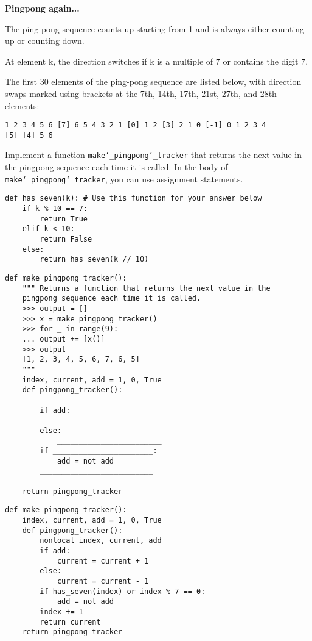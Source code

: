 \begin{blocksection}
\question \textbf{Pingpong again...}\\
\begin{nonsol}
The ping-pong sequence counts up starting from 1 and is
always either counting up or counting down.

At element k, the direction switches if k is a multiple of 7 or contains the
digit 7.

The first 30 elements of the ping-pong sequence are listed below, with direction
swaps marked using brackets at the 7th, 14th, 17th, 21st, 27th, and 28th
elements:
\begin{lstlisting}
1 2 3 4 5 6 [7] 6 5 4 3 2 1 [0] 1 2 [3] 2 1 0 [-1] 0 1 2 3 4
[5] [4] 5 6
\end{lstlisting}
\end{nonsol}

Implement a function \texttt{make\char`_pingpong\char`_tracker} that returns the
next value in the pingpong sequence each time it is called. In the body of
\texttt{make\char`_pingpong\char`_tracker}, you can use assignment statements.
\newline

\begin{lstlisting}
def has_seven(k): # Use this function for your answer below
    if k % 10 == 7:
        return True
    elif k < 10:
        return False
    else:
        return has_seven(k // 10)
\end{lstlisting}

\begin{nonsol}
\begin{lstlisting}
def make_pingpong_tracker():
    """ Returns a function that returns the next value in the
    pingpong sequence each time it is called.
    >>> output = []
    >>> x = make_pingpong_tracker()
    >>> for _ in range(9):
    ... output += [x()]
    >>> output
    [1, 2, 3, 4, 5, 6, 7, 6, 5]
    """
    index, current, add = 1, 0, True
    def pingpong_tracker():
        ___________________________
        if add:
            ________________________
        else:
            ________________________
        if _______________________:
            add = not add
        __________________________
        __________________________
    return pingpong_tracker

\end{lstlisting}
\end{nonsol}

\begin{solution}
\begin{lstlisting}
def make_pingpong_tracker():
    index, current, add = 1, 0, True
    def pingpong_tracker():
        nonlocal index, current, add
        if add:
            current = current + 1
        else:
            current = current - 1
        if has_seven(index) or index % 7 == 0:
            add = not add
        index += 1
        return current
    return pingpong_tracker
\end{lstlisting}
\end{solution}

\end{blocksection}

